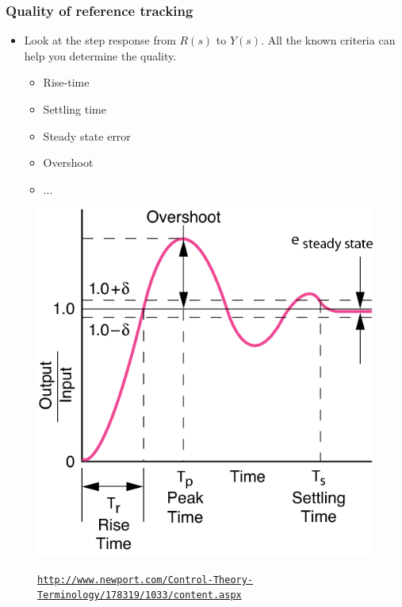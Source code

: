 \begin{frame}
	\frametitle{Quality of reference tracking}
	\begin{minipage}{0.5\linewidth}
		\begin{itemize}
			\item Look at the step response from $R(s)$ to $Y(s)$. All the known criteria can help you determine the quality.
			\begin{itemize}
				\item Rise-time
				\item Settling time
				\item Steady state error
				\item Overshoot
				\item ...
			\end{itemize}
		\end{itemize}
	\end{minipage}
	\hfill
	\begin{minipage}{0.4\linewidth}
		\begin{figure}
			\centering
			\includegraphics[width=1\linewidth]{properties}
			\label{fig:properties}
			\caption{\tiny \raggedleft
				\href{http://www.newport.com/Control-Theory-Terminology/178319/1033/content.aspx}{\nolinkurl{http://www.newport.com/Control-Theory-Terminology/178319/1033/content.aspx}}}
		\end{figure}
	\end{minipage}
\end{frame}


